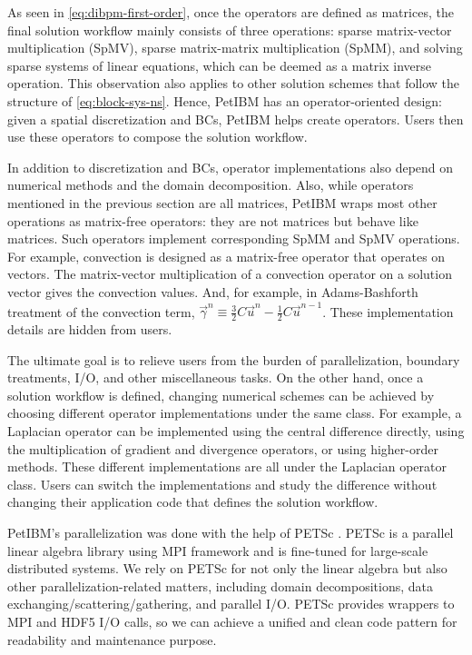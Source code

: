 

As seen in \eqref{eq:dibpm-first-order}, once the operators are defined as matrices, the final solution workflow mainly consists of three operations: sparse matrix-vector multiplication (SpMV), sparse matrix-matrix multiplication (SpMM), and solving sparse systems of linear equations, which can be deemed as a matrix inverse operation.
This observation also applies to other solution schemes that follow the structure of \eqref{eq:block-sys-ns}.
Hence, PetIBM has an operator-oriented design: given a spatial discretization and BCs, PetIBM helps create operators.
Users then use these operators to compose the solution workflow.

In addition to discretization and BCs, operator implementations also depend on numerical methods and the domain decomposition.
Also, while operators mentioned in the previous section are all matrices, PetIBM wraps most other operations as matrix-free operators: they are not matrices but behave like matrices.
Such operators implement corresponding SpMM and SpMV operations.
For example, convection is designed as a matrix-free operator that operates on vectors.
The matrix-vector multiplication of a convection operator on a solution vector gives the convection values. 
And, for example, in Adams-Bashforth treatment of the convection term, $\vec{\gamma}^n \equiv \frac{3}{2}C\vec{u}^{n} - \frac{1}{2}C\vec{u}^{n-1}$.
These implementation details are hidden from users.

The ultimate goal is to relieve users from the burden of parallelization, boundary treatments, I/O, and other miscellaneous tasks.
On the other hand, once a solution workflow is defined, changing numerical schemes can be achieved by choosing different operator implementations under the same class.
For example, a Laplacian operator can be implemented using the central difference directly, using the multiplication of gradient and divergence operators, or using higher-order methods.
These different implementations are all under the Laplacian operator class.
Users can switch the implementations and study the difference without changing their application code that defines the solution workflow.

PetIBM's parallelization was done with the help of PETSc \cite{balay_petsc_2017}.
PETSc is a parallel linear algebra library using MPI framework and is fine-tuned for large-scale distributed systems.
We rely on PETSc for not only the linear algebra but also other parallelization-related matters, including domain decompositions, data exchanging/scattering/gathering, and parallel I/O.
PETSc provides wrappers to MPI and HDF5 I/O calls, so we can achieve a unified and clean code pattern for readability and maintenance purpose.

